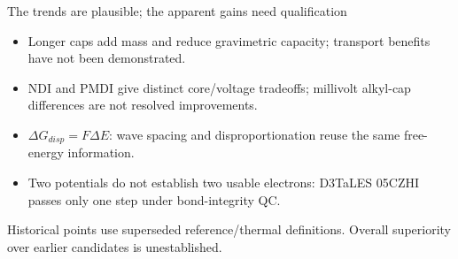 \begin{frame}{The trends are plausible; the apparent gains need qualification}
\begin{itemize}
\item Longer caps add mass and reduce gravimetric capacity; transport benefits have not been demonstrated.
\item NDI and PMDI give distinct core/voltage tradeoffs; millivolt alkyl-cap differences are not resolved improvements.
\item $\Delta G_{disp}=F\Delta E$: wave spacing and disproportionation reuse the same free-energy information.
\item Two potentials do not establish two usable electrons: D3TaLES 05CZHI passes only one step under bond-integrity QC.
\end{itemize}
\vfill\scriptsize Historical points use superseded reference/thermal definitions. Overall superiority over earlier candidates is unestablished.
\end{frame}
